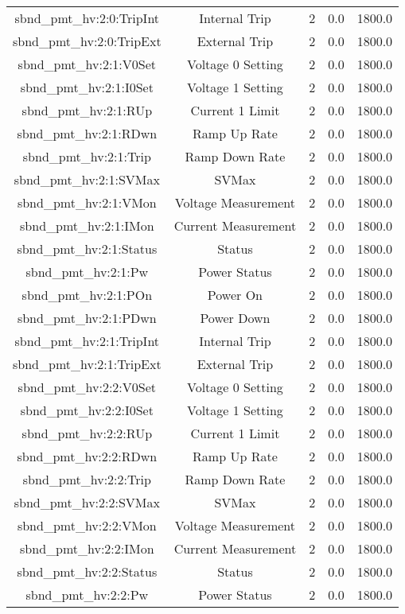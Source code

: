 \begin{center}
\begin{longtable}{c | c c c c }
sbnd\_pmt\_hv:2:0:TripInt & Internal Trip & 2 & 0.0 & 1800.0\\ 
sbnd\_pmt\_hv:2:0:TripExt & External Trip & 2 & 0.0 & 1800.0\\ 
sbnd\_pmt\_hv:2:1:V0Set & Voltage 0 Setting & 2 & 0.0 & 1800.0\\ 
sbnd\_pmt\_hv:2:1:I0Set & Voltage 1 Setting & 2 & 0.0 & 1800.0\\ 
sbnd\_pmt\_hv:2:1:RUp & Current 1 Limit & 2 & 0.0 & 1800.0\\ 
sbnd\_pmt\_hv:2:1:RDwn & Ramp Up Rate & 2 & 0.0 & 1800.0\\ 
sbnd\_pmt\_hv:2:1:Trip & Ramp Down Rate & 2 & 0.0 & 1800.0\\ 
sbnd\_pmt\_hv:2:1:SVMax & SVMax & 2 & 0.0 & 1800.0\\ 
sbnd\_pmt\_hv:2:1:VMon & Voltage Measurement & 2 & 0.0 & 1800.0\\ 
sbnd\_pmt\_hv:2:1:IMon & Current Measurement & 2 & 0.0 & 1800.0\\ 
sbnd\_pmt\_hv:2:1:Status & Status & 2 & 0.0 & 1800.0\\ 
sbnd\_pmt\_hv:2:1:Pw & Power Status & 2 & 0.0 & 1800.0\\ 
sbnd\_pmt\_hv:2:1:POn & Power On & 2 & 0.0 & 1800.0\\ 
sbnd\_pmt\_hv:2:1:PDwn & Power Down & 2 & 0.0 & 1800.0\\ 
sbnd\_pmt\_hv:2:1:TripInt & Internal Trip & 2 & 0.0 & 1800.0\\ 
sbnd\_pmt\_hv:2:1:TripExt & External Trip & 2 & 0.0 & 1800.0\\ 
sbnd\_pmt\_hv:2:2:V0Set & Voltage 0 Setting & 2 & 0.0 & 1800.0\\ 
sbnd\_pmt\_hv:2:2:I0Set & Voltage 1 Setting & 2 & 0.0 & 1800.0\\ 
sbnd\_pmt\_hv:2:2:RUp & Current 1 Limit & 2 & 0.0 & 1800.0\\ 
sbnd\_pmt\_hv:2:2:RDwn & Ramp Up Rate & 2 & 0.0 & 1800.0\\ 
sbnd\_pmt\_hv:2:2:Trip & Ramp Down Rate & 2 & 0.0 & 1800.0\\ 
sbnd\_pmt\_hv:2:2:SVMax & SVMax & 2 & 0.0 & 1800.0\\ 
sbnd\_pmt\_hv:2:2:VMon & Voltage Measurement & 2 & 0.0 & 1800.0\\ 
sbnd\_pmt\_hv:2:2:IMon & Current Measurement & 2 & 0.0 & 1800.0\\ 
sbnd\_pmt\_hv:2:2:Status & Status & 2 & 0.0 & 1800.0\\ 
sbnd\_pmt\_hv:2:2:Pw & Power Status & 2 & 0.0 & 1800.0\\ 

\end{longtable}
\end{center}

